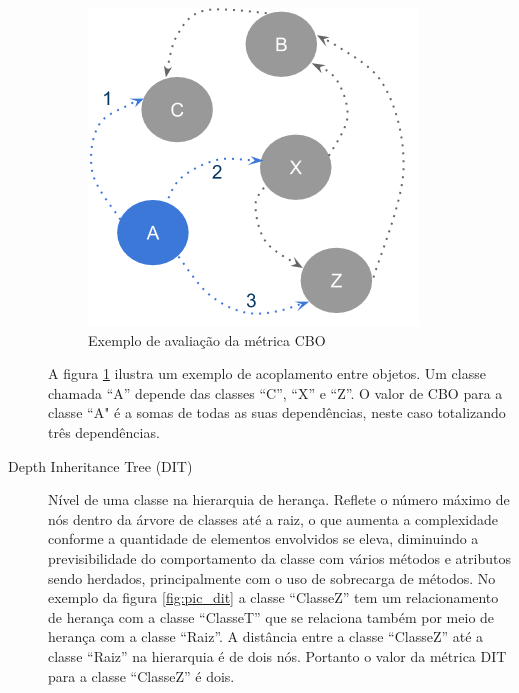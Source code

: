 \documentclass[conference]{IEEEtran}
\begin{document}
\begin{description}
\begin{figure}[htb]
	\begin{center}
		\includegraphics[scale=0.8]{img/pic_cbo.png}
	\end{center}
	\caption{\label{fig:pic_cbo}Exemplo de avaliação da métrica CBO}
	
\end{figure}

A figura \ref{fig:pic_cbo} ilustra um exemplo de acoplamento entre objetos. Um
classe chamada ``A'' depende das classes ``C'', ``X'' e ``Z''. O
valor de CBO para a classe ``A" é a somas de todas as suas
dependências, neste caso totalizando três dependências.


\item[Depth Inheritance Tree (DIT)] Nível de uma classe na
hierarquia de herança. Reflete o número máximo de nós  dentro da árvore
de classes até a raiz, o que aumenta a complexidade conforme a quantidade de
elementos envolvidos se eleva, diminuindo a previsibilidade do comportamento da
classe com vários métodos e atributos sendo herdados, principalmente com o uso
de sobrecarga de métodos. No exemplo da figura \ref{fig:pic_dit} a classe
``ClasseZ'' tem um relacionamento de herança com a classe ``ClasseT'' que se
relaciona também por meio de herança com a classe ``Raiz''. A distância entre a
classe ``ClasseZ'' até a classe ``Raiz'' na hierarquia é de dois nós. Portanto o
valor da métrica DIT para a classe ``ClasseZ'' é dois.



\end{description}
\end{document}
